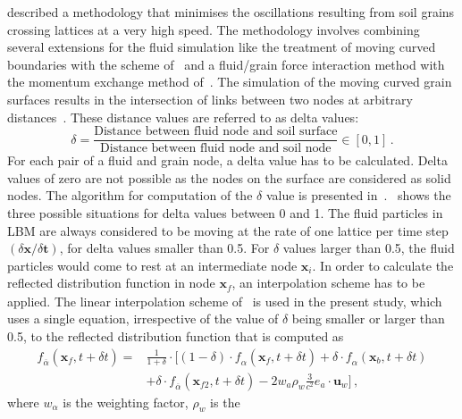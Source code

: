 \citet{Ladd2001} described a methodology that minimises the oscillations 
resulting from soil grains crossing lattices at a very high speed. The 
methodology involves combining several extensions for the fluid simulation like 
the treatment of moving curved boundaries with the scheme of~\citet{Yu2003} and 
a fluid/grain force interaction method with the momentum exchange method  
of~\citet{Ladd2001}. The simulation of the moving curved grain surfaces results 
in the intersection of links between two nodes at arbitrary 
distances~\citep{Iglberger2008}. These distance values are referred to as delta 
values:
%
\begin{equation}
\delta = \frac{\mbox{Distance between fluid node and soil
surface}}{\mbox{Distance between fluid node and soil node}} \in [0,1] \,.
\end{equation} 
%
For each pair of a fluid and grain node, a delta value has to be 
calculated. Delta values of zero are not possible as the nodes on the surface 
are considered as solid nodes. The algorithm for computation of the $\delta$ 
value is presented in~\citet{Iglberger2008}.~ shows the 
three possible situations for delta values between 0 and 1. The 
fluid particles in LBM are always considered to be moving at the rate of one 
lattice per time step $(\delta \mathbf{x}/ \delta \mathbf{t})$, for delta 
values smaller than 0.5. For $\delta$ values larger than 0.5, the fluid 
particles would come to rest at an intermediate node $\mathbf{x}_{\mathit{i}}$. 
In order to calculate the reflected distribution function in node 
$\mathbf{x}_{\mathit{f}}$, an interpolation scheme has to be applied. The 
linear interpolation scheme of~\citet{Yu2003} is used in the present study, 
which uses a single equation, irrespective of the value of $\delta$ being 
smaller or larger than 0.5, to the reflected distribution function that is 
computed as
%
\begin{align}
 \nonumber
\mathit{\mathit{f}}_{\overline{\alpha}}(\mathbf{x}_{\mathit{f}},t + \delta t) = 
& \frac{1}{1 + \delta} \cdot [(1-\delta)\cdot 
\mathit{\mathit{f}}_{\alpha}(\mathbf{x}_{\mathit{f}},t + \delta t) + \delta 
\cdot \mathit{\mathit{f}}_{\alpha}(\mathbf{x}_{\mathit{b}},t + \delta t)  \\
& + \delta \cdot 
\mathit{\mathit{f}}_{\overline{\alpha}}(\mathbf{x}_{\mathit{f2}},t + \delta t) 
-2\mathit{w}_{\mathit{a}}\rho_{\mathit{w}}\frac{3}{\mathit{c}^{2}}
	\mathbf{\mathit{e}}_{\mathit{a}}\cdot
 \mathbf{u}_{\mathit{w}}]\,,
\end{align}
%
where $\mathit{w}_{\alpha}$ is the weighting factor, $\rho_{\mathit{w}}$ is the 
